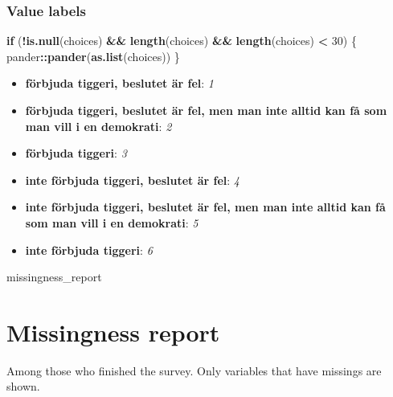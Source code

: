 \documentclass[]{book}
\newenvironment{Shaded}{\begin{snugshade}}{\end{snugshade}}
\newcommand{\KeywordTok}[1]{\textcolor[rgb]{0.13,0.29,0.53}{\textbf{#1}}}
\newcommand{\DecValTok}[1]{\textcolor[rgb]{0.00,0.00,0.81}{#1}}
\newcommand{\StringTok}[1]{\textcolor[rgb]{0.31,0.60,0.02}{#1}}
\newcommand{\ControlFlowTok}[1]{\textcolor[rgb]{0.13,0.29,0.53}{\textbf{#1}}}
\newcommand{\OperatorTok}[1]{\textcolor[rgb]{0.81,0.36,0.00}{\textbf{#1}}}
\newcommand{\NormalTok}[1]{#1}
\providecommand{\tightlist}{%
  \setlength{\itemsep}{0pt}\setlength{\parskip}{0pt}}
\begin{document}
\subsubsection{Value labels}\label{Studie3sel_labels}

\begin{Shaded}
\begin{Highlighting}[]
\ControlFlowTok{if}\NormalTok{ (}\OperatorTok{!}\KeywordTok{is.null}\NormalTok{(choices) }\OperatorTok{&&}\StringTok{ }\KeywordTok{length}\NormalTok{(choices) }\OperatorTok{&&}\StringTok{ }\KeywordTok{length}\NormalTok{(choices) }\OperatorTok{<}\StringTok{ }\DecValTok{30}\NormalTok{) \{}
\NormalTok{    pander}\OperatorTok{::}\KeywordTok{pander}\NormalTok{(}\KeywordTok{as.list}\NormalTok{(choices))}
\NormalTok{\}}
\end{Highlighting}
\end{Shaded}

\begin{itemize}
\tightlist
\item
  \textbf{förbjuda tiggeri, beslutet är fel}: \emph{1}
\item
  \textbf{förbjuda tiggeri, beslutet är fel, men man inte alltid kan få
  som man vill i en demokrati}: \emph{2}
\item
  \textbf{förbjuda tiggeri}: \emph{3}
\item
  \textbf{inte förbjuda tiggeri, beslutet är fel}: \emph{4}
\item
  \textbf{inte förbjuda tiggeri, beslutet är fel, men man inte alltid
  kan få som man vill i en demokrati}: \emph{5}
\item
  \textbf{inte förbjuda tiggeri}: \emph{6}
\end{itemize}

\begin{Shaded}
\begin{Highlighting}[]
\NormalTok{missingness_report}
\end{Highlighting}
\end{Shaded}

\section{Missingness report}\label{missingness-report}

Among those who finished the survey. Only variables that have missings
are shown.
\end{document}
